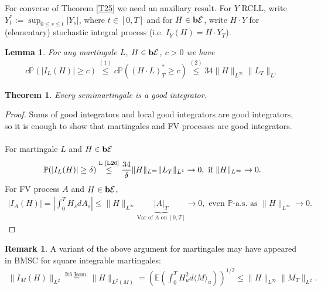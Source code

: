 \documentclass[12pt,a4paper, twoside]{article}
\newtheorem{lem}{Lemma}[section]
\newtheorem{thm}{Theorem}[section]
\theoremstyle{definition}
\newtheorem{rem}{Remark}[section]
\newcommand{\EE}{\mathbb{E}} %
\newcommand{\PP}{\mathbb{P}} %
\newcommand{\simple}{\textbf{\text{b}}\mathcal{E}}
\begin{document}
\newpage
For converse of Theorem \ref{T25} we need an auxiliary result. For $Y$ RCLL, write $Y_t^* := \sup_{0 \leq s \leq t} | Y_s|$, where $ t \in [0,T]$ and for $H \in \simple$, write $H \cdot Y$ for (elementary) stochastic integral process (i.e. $I_Y(H)= H \cdot Y_T$).
\begin{lem}\label{L26} For any martingale $L$,  $H \in \simple$, $c >0$ we have
\begin{align*}
c \PP(  | I_L(H)| \geq c) \overset{(1)}\leq c \PP( ( H \cdot L)_T^* \geq c) \overset{(2)}\leq 34 \|H\|_{L^\infty} \|L_T\|_{L^1}
\end{align*}
\end{lem}
\begin{thm} \label{T27} Every semimartingale is a good integrator. 
\end{thm}
\begin{proof}
Sums of good integrators and local good integrators are good integrators, so it is enough to show that martingales and FV processes are good integrators. 
\\\\
For martingale $L$ and $H \in \simple$ 
\begin{align*}
\PP(|I_L(H)| \geq \delta) \overset{\text{L \ref{L26}}}\leq \frac{34}{\delta} \|H\|_{L^\infty} \|L_T\|_{L^1} \to 0, \text{ if } \|H\|_{L^\infty} \to 0.
\end{align*}
For FV process $A$ and $H \in \simple$, 
\begin{align*}
|I_A(H)| = \left| \int_0^T H_s dA_s \right| \leq \| H\|_{L^\infty} \underbrace{|A|_T}_{\text{Var of $A$ on $[0,T]$}} \to 0, \text{ even } \PP\text{-a.s. as } \|H\|_{L^\infty} \to 0.
\end{align*}
\end{proof}
\begin{rem} A variant of the above argument for martingales may have appeared in BMSC for square integrable martingales:
\begin{align*}
\| I_M(H)\|_{L^2} \overset{\text{Itô Isom.}} = \|H\|_{L^2(M)} = \left( \EE \left( \int_0 ^T H_u^2 d \langle M \rangle_u \right) \right)^{1/2} \leq \|H\|_{L^\infty} \|M_T\|_{L^2}. 
\end{align*}
\end{rem}
\end{document}
